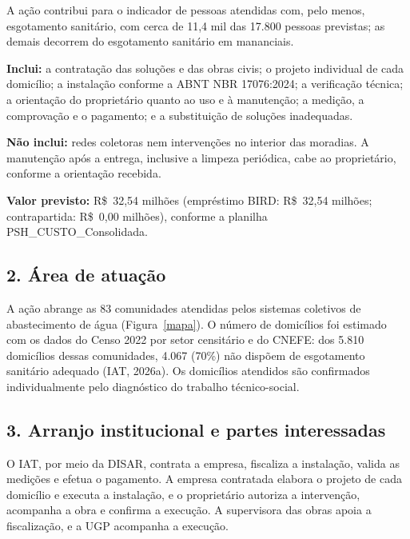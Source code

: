 A ação contribui para o indicador de pessoas atendidas com, pelo menos, esgotamento sanitário, com cerca de 11,4 mil das 17.800 pessoas previstas; as demais decorrem do esgotamento sanitário em mananciais.

\textbf{Inclui:} a contratação das soluções e das obras civis; o projeto individual de cada domicílio; a instalação conforme a ABNT NBR 17076:2024; a verificação técnica; a orientação do proprietário quanto ao uso e à manutenção; a medição, a comprovação e o pagamento; e a substituição de soluções inadequadas.

\textbf{Não inclui:} redes coletoras nem intervenções no interior das moradias. A manutenção após a entrega, inclusive a limpeza periódica, cabe ao proprietário, conforme a orientação recebida.


\textbf{Valor previsto:} R\$~32,54 milhões (empréstimo BIRD: R\$~32,54 milhões; contrapartida: R\$~0,00 milhões), conforme a planilha PSH\_CUSTO\_Consolidada.

{}
\subsection*{2. Área de atuação}

A ação abrange as 83 comunidades atendidas pelos sistemas coletivos de abastecimento de água (Figura~\ref{mapa}). O número de domicílios foi estimado com os dados do Censo 2022 por setor censitário e do CNEFE: dos 5.810 domicílios dessas comunidades, 4.067 (70\%) não dispõem de esgotamento sanitário adequado (IAT, 2026a). Os domicílios atendidos são confirmados individualmente pelo diagnóstico do trabalho técnico-social.

{}
\subsection*{3. Arranjo institucional e partes interessadas}

O IAT, por meio da DISAR, contrata a empresa, fiscaliza a instalação, valida as medições e efetua o pagamento. A empresa contratada elabora o projeto de cada domicílio e executa a instalação, e o proprietário autoriza a intervenção, acompanha a obra e confirma a execução. A supervisora das obras apoia a fiscalização, e a UGP acompanha a execução.

